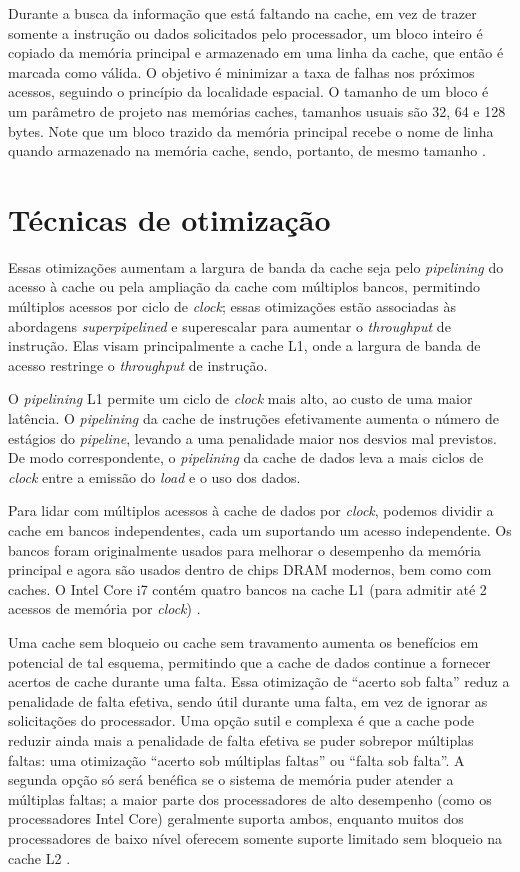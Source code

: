Durante a busca da informação que está faltando na cache, em vez de trazer somente a instrução ou dados solicitados pelo processador, um bloco inteiro é copiado da memória principal e armazenado em uma linha da cache, que então é marcada como válida. O objetivo é minimizar a taxa de falhas nos próximos acessos, seguindo o princípio da localidade espacial. O tamanho de um bloco é um parâmetro de projeto nas memórias caches, tamanhos usuais são 32, 64 e 128 bytes. Note que um bloco trazido da memória principal recebe o nome de linha quando armazenado na memória cache, sendo, portanto, de mesmo tamanho \cite{silva2024}.

\section{Técnicas de otimização}
Essas otimizações aumentam a largura de banda da cache seja pelo \textit{pipelining} do acesso à cache ou pela ampliação da cache com múltiplos bancos, permitindo múltiplos acessos por ciclo de \textit{clock}; essas otimizações estão associadas às abordagens \textit{superpipelined} e superescalar para aumentar o \textit{throughput} de instrução. Elas visam principalmente a cache L1, onde a largura de banda de acesso restringe o \textit{throughput} de instrução.

O \textit{pipelining} L1 permite um ciclo de \textit{clock} mais alto, ao custo de uma maior latência. O \textit{pipelining} da cache de instruções efetivamente aumenta o número de estágios do \textit{pipeline}, levando a uma penalidade maior nos desvios mal previstos. De modo correspondente, o \textit{pipelining} da cache de dados leva a mais ciclos de \textit{clock} entre a emissão do \textit{load} e o uso dos dados.

Para lidar com múltiplos acessos à cache de dados por \textit{clock}, podemos dividir a cache em bancos independentes, cada um suportando um acesso independente. Os bancos foram originalmente usados para melhorar o desempenho da memória principal e agora são usados dentro de chips DRAM modernos, bem como com caches. O Intel Core i7 contém quatro bancos na cache L1 (para admitir até 2 acessos de memória por \textit{clock}) \cite{hennessy2019}.

Uma cache sem bloqueio ou cache sem travamento aumenta os benefícios em potencial de tal esquema, permitindo que a cache de dados continue a fornecer acertos de cache durante uma falta. Essa otimização de ``acerto sob falta'' reduz a penalidade de falta efetiva, sendo útil durante uma falta, em vez de ignorar as solicitações do processador. Uma opção sutil e complexa é que a cache pode reduzir ainda mais a penalidade de falta efetiva se puder sobrepor múltiplas faltas: uma otimização ``acerto sob múltiplas faltas'' ou ``falta sob falta''. A segunda opção só será benéfica se o sistema de memória puder atender a múltiplas faltas; a maior parte dos processadores de alto desempenho (como os processadores Intel Core) geralmente suporta ambos, enquanto muitos dos processadores de baixo nível oferecem somente suporte limitado sem bloqueio na cache L2 \cite{hennessy2019}.

